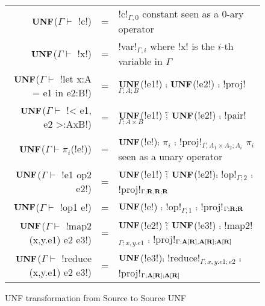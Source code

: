 \begin{figure*}[t]
    \begin{tabular}{r c l}
    $\mathbf{UNF}$($\Gamma\vdash $ !c!) &=& !c!$_{\Gamma,0}$ constant seen as a 0-ary operator\\
    $\mathbf{UNF}$($\Gamma\vdash $ !x!) &=& !var!$_{\Gamma,i}$ where !x! is the $i$-th variable in $\Gamma$ \\
    $\mathbf{UNF}$($\Gamma\vdash $ !let x:A = e1 in e2:B!) &=& $\mathbf{UNF}$(!e1!) $\comp$ $\mathbf{UNF}$(!e2!) $\comp$ !proj!$_{\Gamma;A;B}$  \\ 
    $\mathbf{UNF}$($\Gamma\vdash $ !< e1, e2 >:AxB!) &=& $\mathbf{UNF}$(!e1!) $\widetilde{;}$ $\mathbf{UNF}$(!e2!) $\comp$ !pair!$_{\Gamma;A\times B}$ \\ 
    $\mathbf{UNF}$($\Gamma\vdash \pi_i$(!e!)) &=& $\mathbf{UNF}$(!e!)$\comp $ $\pi_i$ $\comp$ !proj!$_{\Gamma;A_1\times A_2;A_i}$ $\pi_i$ seen as a unary operator\\
    $\mathbf{UNF}$($\Gamma\vdash $ !e1 op2 e2!) &=& $\mathbf{UNF}$(!e1!) $\widetilde{;}$ $\mathbf{UNF}$(!e2!)$\comp$ !op!$_{\Gamma;2}$ $\comp$ !proj!$_{\Gamma;\mathbf{R},\mathbf{R};\mathbf{R}}$ \\
    $\mathbf{UNF}$($\Gamma\vdash $ !op1 e!) &=& $\mathbf{UNF}$(!e!) $\comp$ !op!$_{\Gamma;1}$ $\comp$ !proj!$_{\Gamma;\mathbf{R};\mathbf{R}}$ \\
    $\mathbf{UNF}$($\Gamma\vdash $ !map2 (x,y.e1) e2 e3!) &=& $\mathbf{UNF}$(!e2!) $\widetilde{;}$ $\mathbf{UNF}$(!e3!) $\comp$ !map2!$_{\Gamma; x,y.e1}$ $\comp$ !proj!$_{\Gamma;\mathbf{A}[\mathbf{R}],\mathbf{A}[\mathbf{R}];\mathbf{A}[\mathbf{R}]}$ \\ 
    $\mathbf{UNF}$($\Gamma\vdash $ !reduce (x,y.e1) e2 e3!) &=& $\mathbf{UNF}$(!e3!)$\comp$ !reduce!$_{\Gamma; x,y.e1; e2}$ $\comp$ !proj!$_{\Gamma;\mathbf{A}[\mathbf{R}];\mathbf{A}[\mathbf{R}]}$ \\ 
    \end{tabular}
    \caption{UNF transformation from Source to Source UNF}
    \label{fig:source_to_unf}
    \end{figure*}